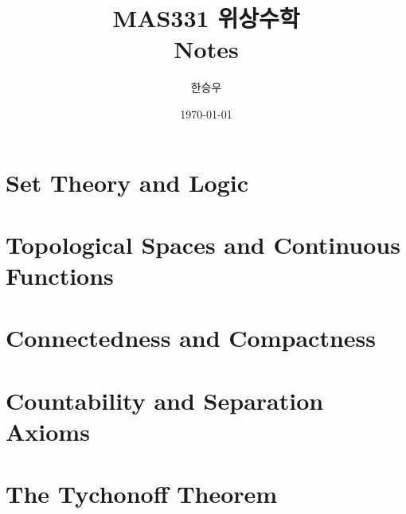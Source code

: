 \documentclass[a4paper,12pt]{report}
\title{\Huge{MAS331 위상수학}\\Notes}
\author{\huge{한승우}}
\date{\today}
\begin{document}
\maketitle
\newpage
{}
\tableofcontents
\pagebreak
\chapter{Set Theory and Logic}
 
\chapter{Topological Spaces and Continuous Functions}

\chapter{Connectedness and Compactness}

\chapter{Countability and Separation Axioms}

\chapter{The Tychonoff Theorem}

\end{document}
